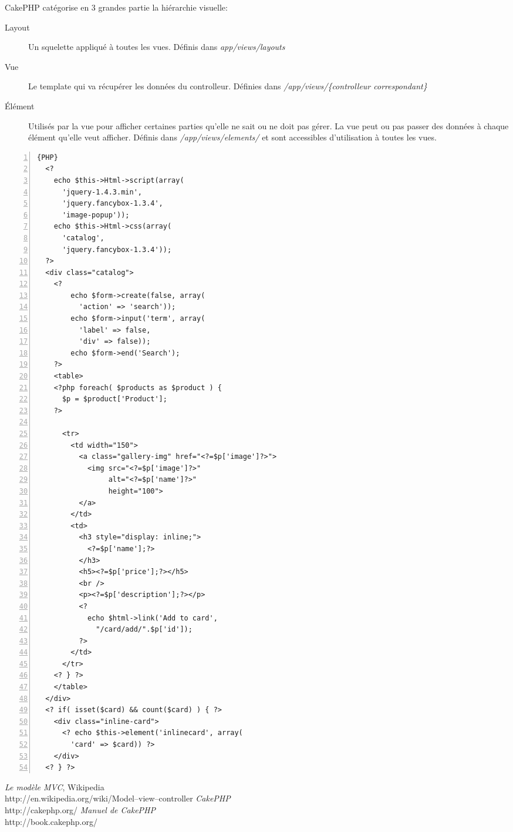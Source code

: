 \documentclass[12pt]{article}
\begin{document}
    CakePHP catégorise en 3 grandes partie la hiérarchie visuelle:
    \begin{description}
      \item[Layout] Un squelette appliqué à toutes les vues. Définis dans \emph{app/views/layouts}
      \item[Vue] Le template qui va récupérer les données du controlleur. Définies dans \emph{/app/views/\{controlleur correspondant\}}
      \item[Élément] Utilisés par la vue pour afficher certaines parties qu'elle ne sait ou ne doit pas gérer. La vue peut ou pas passer des données à chaque élément qu'elle veut afficher. Définis dans \emph{/app/views/elements/} et sont accessibles d'utilisation à toutes les vues.
    \end{description}
    \begin{lstlisting}[numbers=left,firstnumber=1,numbersep=-8pt,caption=Exemple vue]{PHP}
  <? 
    echo $this->Html->script(array(
      'jquery-1.4.3.min', 
      'jquery.fancybox-1.3.4', 
      'image-popup'));
    echo $this->Html->css(array(
      'catalog', 
      'jquery.fancybox-1.3.4'));
  ?>
  <div class="catalog">
    <?
        echo $form->create(false, array(
          'action' => 'search')); 
        echo $form->input('term', array(
          'label' => false, 
          'div' => false));
        echo $form->end('Search');
    ?>
    <table>
    <?php foreach( $products as $product ) { 
      $p = $product['Product'];
    ?>
    
      <tr>
        <td width="150">
          <a class="gallery-img" href="<?=$p['image']?>">
            <img src="<?=$p['image']?>" 
                 alt="<?=$p['name']?>" 
                 height="100">
          </a>
        </td>
        <td>
          <h3 style="display: inline;">
            <?=$p['name'];?>
          </h3>
          <h5><?=$p['price'];?></h5>
          <br />
          <p><?=$p['description'];?></p>
          <? 
            echo $html->link('Add to card', 
              "/card/add/".$p['id']); 
          ?>
        </td>
      </tr>    
    <? } ?>
    </table>
  </div>
  <? if( isset($card) && count($card) ) { ?>
    <div class="inline-card">
      <? echo $this->element('inlinecard', array(
        'card' => $card)) ?>
    </div>
  <? } ?>
    \end{lstlisting}
  \begin{thebibliography}{9}
      \emph{Le modèle MVC}, Wikipedia\\
      \mbox{http://en.wikipedia.org/wiki/Model–view–controller}
      \emph{CakePHP}\\
      \mbox{http://cakephp.org/}
      \emph{Manuel de CakePHP}\\
      \mbox{http://book.cakephp.org/}
  \end{thebibliography}
\end{document}
